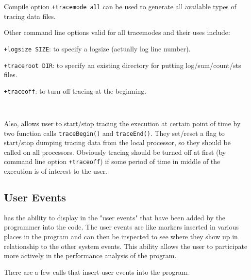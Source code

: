 \documentclass[10pt,dvips]{article}
\begin{document}
Compile option {\tt +tracemode all} can be used to generate all available types
of tracing data files.

Other command line options valid for all tracemodes and their uses include:

{\tt +logsize SIZE}: to specify a logsize (actually log line number).

{\tt +traceroot DIR}: to specify an existing directory for putting log/sum/count/sts
files.

{\tt +traceoff}: to turn off tracing at the beginning.

\

Also, \charmpp{} allows user to start/stop tracing the execution at certain
point of time by two \charmpp{} function calls {\tt traceBegin()} and {\tt traceEnd()}.
They set/reset a flag to start/stop dumping tracing data from the local processor,
so they should be called on all processors. Obviously tracing should be turned
off at first (by command line option {\tt +traceoff}) if some period of time in
middle of the execution is of interest to the user.

\subsection{User Events}

\projections{} has the ability to display in \projections{} the "user events"
that have been added by the programmer into the code. The user events are
like markers inserted in various places in the program and can then be inspected
to see where they show up in relationship to the other \charmpp{} system events.
This ability allows the user to participate more actively in the performance analysis
of the program.

There are a few \charmpp{} calls that insert user events into the program.
\end{document}
